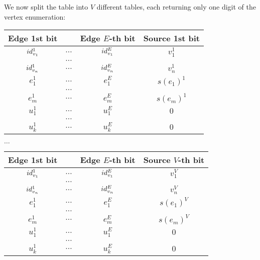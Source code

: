 %
We now split the table into $V$ different tables, each returning only one digit of the 
vertex enumeration:
%
%
\begin{center}\scriptsize
  \begin{tabular}{ccc|c}
    Edge 1st bit & & Edge $E$-th bit & Source 1st bit \\
  \hline
    $id_{v_1}^1$ & $\dots$ & $id_{v_1}^E$ & $v_1^1$\\
                           & $\dots$ &                         &\\
    $id_{v_n}^1$ & $\dots$ & $id_{v_n}^E$ & $v_n^1$\\
    $e_1^1$          & $\dots$ & $e_1^E$         & $s(e_1)^1$\\
                            & $\dots$ &                        &\\
    $e_m^1$         & $\dots$ & $e_m^E$        & $s(e_m)^1$\\
    $u_1^1$          & $\dots$ & $u_1^E$         & $0$\\
                            & $\dots$ &                        &\\
    $u_k^1$          & $\dots$ & $u_k^E$         & $0$\\
  \end{tabular}
  \hspace{1em}
    $\dots$
  \hspace{1em}
  \begin{tabular}{ccc|c}
    Edge 1st bit & & Edge $E$-th bit & Source $V$-th bit \\
  \hline
    $id_{v_1}^1$ & $\dots$ & $id_{v_1}^E$ & $v_1^V$\\
                           & $\dots$ &                         &\\
    $id_{v_n}^1$ & $\dots$ & $id_{v_n}^E$ & $v_n^V$\\
    $e_1^1$          & $\dots$ & $e_1^E$         & $s(e_1)^V$\\
                            & $\dots$ &                        &\\
    $e_m^1$         & $\dots$ & $e_m^E$        & $s(e_m)^V$\\
    $u_1^1$          & $\dots$ & $u_1^E$         & $0$\\
                            & $\dots$ &                        &\\
    $u_k^1$          & $\dots$ & $u_k^E$         & $0$\\
  \end{tabular}
\end{center}
